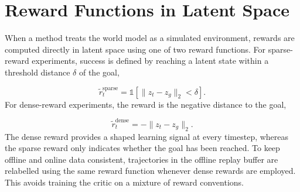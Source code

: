\section{Reward Functions in Latent Space}
\label{sec:wmep-setup}

When a method treats the world model as a simulated environment, rewards
are computed directly in latent space using one of two reward functions.
For sparse-reward experiments, success is defined by reaching a latent
state within a threshold distance $\delta$ of the goal,

\begin{equation}
\tilde r_t^{\mathrm{sparse}}
=
\mathbb{1}\!\left[\|z_t-z_g\|_2 < \delta\right].
\end{equation}
For dense-reward experiments, the reward is the negative distance to
the goal,

\begin{equation}
\tilde r_t^{\mathrm{dense}}
=
-\|z_t-z_g\|_2.
\end{equation}
The dense reward provides a shaped learning signal at every timestep,
whereas the sparse reward only indicates whether the goal has been
reached. To keep offline and online data consistent, trajectories in the
offline replay buffer are relabelled using the same reward function
whenever dense rewards are employed. This avoids training the critic on
a mixture of reward conventions.
